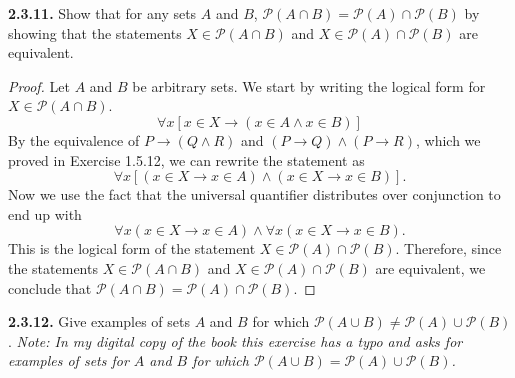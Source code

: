 \documentclass[12pt]{amsart}
\newenvironment{statement}[1]{\smallskip\noindent\color[rgb]{.6627, .3529, .6314} {\bf #1.}}{}
\theoremstyle{definition}
\theoremstyle{remark}
\begin{document}
\begin{statement}{2.3.11}
Show that for any sets $A$ and $B$,
$\mathscr{P}(A \cap B) = \mathscr{P}(A) \cap \mathscr{P}(B)$
by showing that the statements $X \in \mathscr{P}(A \cap B)$ and 
$X \in \mathscr{P}(A) \cap \mathscr{P}(B)$ are equivalent.
\end{statement}

\begin{proof}
Let $A$ and $B$ be arbitrary sets.
We start by writing the logical form for $X \in \mathscr{P}(A \cap B)$.
\begin{equation*}
	\forall x [x \in X \rightarrow (x \in A \wedge x \in B)]
\end{equation*}
By the equivalence of
$P \rightarrow (Q \wedge R)$ and $(P \rightarrow Q) \wedge (P \rightarrow R)$, 
which we proved in Exercise 1.5.12,
we can rewrite the statement as
\begin{equation*}
	\forall x [(x \in X \rightarrow x \in A) \wedge (x \in X \rightarrow x \in B)].
\end{equation*}
Now we use the fact that the universal quantifier distributes over conjunction to end up with
\begin{equation*}
	\forall x (x \in X \rightarrow x \in A) \wedge \forall x (x \in X \rightarrow x \in B).
\end{equation*}
This is the logical form of the statement $X \in \mathscr{P}(A) \cap \mathscr{P}(B)$.
Therefore, since the statements $X \in \mathscr{P}(A \cap B)$ and 
$X \in \mathscr{P}(A) \cap \mathscr{P}(B)$ are equivalent,
we conclude that $\mathscr{P}(A \cap B) = \mathscr{P}(A) \cap \mathscr{P}(B)$.
\end{proof}


\begin{statement}{2.3.12}
Give examples of sets $A$ and $B$ for which
$\mathscr{P}(A \cup B) \neq \mathscr{P}(A) \cup \mathscr{P}(B)$.
\emph{Note: In my digital copy of the book this exercise has a typo and asks for examples 
of sets for $A$ and $B$ for which
$\mathscr{P}(A \cup B) = \mathscr{P}(A) \cup \mathscr{P}(B)$.}
\end{statement}
\end{document}
